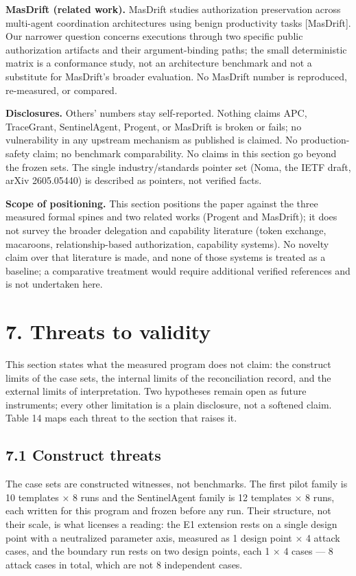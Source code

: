 \documentclass[
  10pt,
]{article}
\newcounter{none} %
\renewcommand{\_}{\origunderscore\allowbreak}
\begin{document}
\textbf{MasDrift (related work).} MasDrift studies authorization
preservation across multi-agent coordination architectures using benign
productivity tasks {[}MasDrift{]}. Our narrower question concerns
executions through two specific public authorization artifacts and their
argument-binding paths; the small deterministic matrix is a conformance
study, not an architecture benchmark and not a substitute for MasDrift's
broader evaluation. No MasDrift number is reproduced, re-measured, or
compared.

\textbf{Disclosures.} Others' numbers stay self-reported. Nothing claims
APC, TraceGrant, SentinelAgent, Progent, or MasDrift is broken or fails;
no vulnerability in any upstream mechanism as published is claimed. No
production-safety claim; no benchmark comparability. No claims in this
section go beyond the frozen sets. The single industry/standards pointer
set (Noma, the IETF draft, arXiv 2605.05440) is described as pointers,
not verified facts.

\textbf{Scope of positioning.} This section positions the paper against
the three measured formal spines and two related works (Progent and
MasDrift); it does not survey the broader delegation and capability
literature (token exchange, macaroons, relationship-based authorization,
capability systems). No novelty claim over that literature is made, and
none of those systems is treated as a baseline; a comparative treatment
would require additional verified references and is not undertaken here.

\section{7. Threats to validity}\label{threats-to-validity}

This section states what the measured program does not claim: the
construct limits of the case sets, the internal limits of the
reconciliation record, and the external limits of interpretation. Two
hypotheses remain open as future instruments; every other limitation is
a plain disclosure, not a softened claim. Table 14 maps each threat to
the section that raises it.

\subsection{7.1 Construct threats}\label{construct-threats}

The case sets are constructed witnesses, not benchmarks. The first pilot
family is 10 templates × 8 runs and the SentinelAgent family is 12
templates × 8 runs, each written for this program and frozen before any
run. Their structure, not their scale, is what licenses a reading: the
E1 extension rests on a single design point with a neutralized parameter
axis, measured as 1 design point × 4 attack cases, and the boundary run
rests on two design points, each 1 × 4 cases --- 8 attack cases in
total, which are not 8 independent cases.
\end{document}
